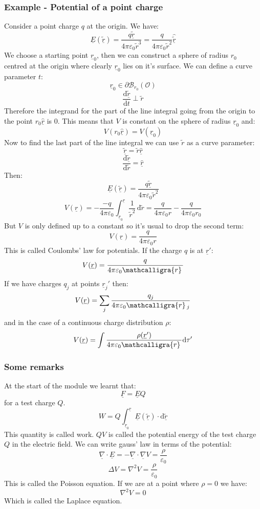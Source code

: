 \documentclass[12pt]{article}
\newcommand{\df}[2]{\frac{\text{d}#1}{\text{d}#2}}
\newcommand{\dive}[1]{\underline{\nabla}\cdot\underline{#1}}
\newcommand{\grad}[1]{\underline{\nabla}#1}
\newcommand{\scriptr}{\ensuremath{\mathcalligra{r}}\,}
\begin{document}
\subsubsection{Example - Potential of a point charge}
Consider a point charge \(q\) at the origin. We have:
\[\underline{E}(\underline{\tilde{r}})=\frac{q\underline{\tilde{r}}}{4\pi\varepsilon_0 \tilde{r}^3}=\frac{q}{4\pi\varepsilon_0\tilde{r}^2}\underline{\hat{\tilde{r}}}\]
We choose a starting point \(\underline{r}_0\), then we can construct a sphere of radius \(r_0\) centred at the origin where clearly \(\underline{r}_0\) lies on it's surface. We can define a curve parameter \(t\):
\[\underline{r}_0\in \partial \mathcal{B}_{r_0}(\mathcal{O})\]
\[\df{\underline{\tilde{r}}}{t}\perp \tilde{r}\]
Therefore the integrand for the part of the line integral going from the origin to the point \(r_0\underline{\hat{r}}\) is 0. This means that \(V\) is constant on the sphere of radius \(\underline{r}_0\) and:
\[V(r_0\underline{\hat{r}})=V(\underline{r}_0)\]
Now to find the last part of the line integral we can use \(\tilde{r}\) as a curve parameter:
\[\underline{\tilde{r}}=\tilde{r}\underline{\hat{r}}\]
\[\df{\underline{\tilde{r}}}{\tilde{r}}=\underline{\hat{r}}\]
Then:
\[\underline{E}(\underline{\tilde{r}})=\frac{q\underline{\tilde{r}}}{4\pi\varepsilon_0\tilde{r}^2}\]
\[V(\underline{r})=-\frac{-q}{4\pi\varepsilon_0}\int^{\underline{r}}_{\underline{r}_0}\frac{1}{\tilde{r}^2}\,\text{d}\tilde{r}=\frac{q}{4\pi\varepsilon_0r}-\frac{q}{4\pi\varepsilon_0r_0}\]
But \(V\) is only defined up to a constant so it's usual to drop the second term:
\[V(\underline{r})=\frac{q}{4\pi\varepsilon_0r}\]
This is called Coulombs' law for potentials. If the charge \(q\) is at \(\underline{r}'\):
\[V(\underline{r})=\frac{q}{4\pi\varepsilon_0\scriptr}\]
If we have charges \(q_j\) at points \(\underline{r}_j'\) then:
\[V(\underline{r})=\sum_j\frac{q_j}{4\pi\varepsilon_0\scriptr_j}\]
and in the case of a continuous charge distribution \(\rho\):
\[V(\underline{r})=\int\frac{\rho(\underline{r}')}{4\pi\varepsilon_0\scriptr}\text{d}\tau'\]
\subsubsection{Some remarks}
At the start of the module we learnt that:
\[\underline{F}=\underline{E}Q\]
for a test charge \(Q\).
\[W=Q\int^{\underline{r}}_{\underline{r}_0}\underline{E}(\underline{\tilde{r}})\cdot\text{d}\underline{\tilde{r}}\]
This quantity is called work. \(QV\) is called the potential energy of the test charge \(Q\) in the electric field. We can write gauss' law in terms of the potential:
\[\dive{E}=-\underline{\nabla}\cdot\grad{V}=\frac{\rho}{\varepsilon_0}\]
\[\Delta V=\nabla^2V=\frac{\rho}{\varepsilon_0}\]
This is called the Poisson equation. If we are at a point where \(\rho=0\) we have:
\[\nabla^2V=0\]
Which is called the Laplace equation.
\end{document}
